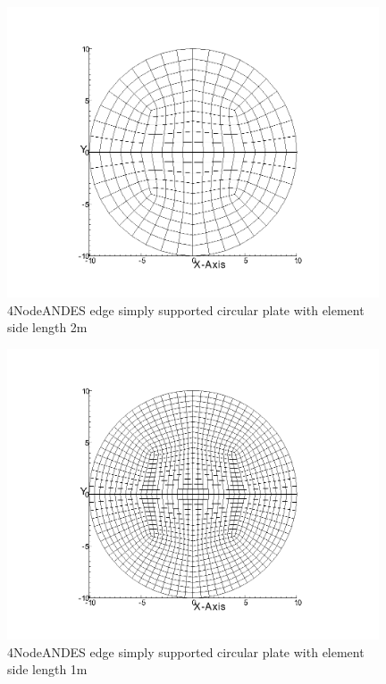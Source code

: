 \documentclass[fleqn,11pt,letter]{article}
\begin{document}
\begin{figure}[H]
  \centering
  \includegraphics[width=11cm]{../Figure_files/4NodeANDES/circular_plate3.png}
  \caption{4NodeANDES edge simply supported circular plate with element side length 2m }
  \label{fig 4NodeANDES edges simply supported circular plate with element side length 2m }
\end{figure}

\newpage

\begin{figure}[H]
  \centering
  \includegraphics[width=11cm]{../Figure_files/4NodeANDES/circular_plate4.png}
  \caption{4NodeANDES edge simply supported circular plate with element side length 1m }
  \label{fig 4NodeANDES edges simply supported circular plate with element side length 1m }
\end{figure}
\end{document}

